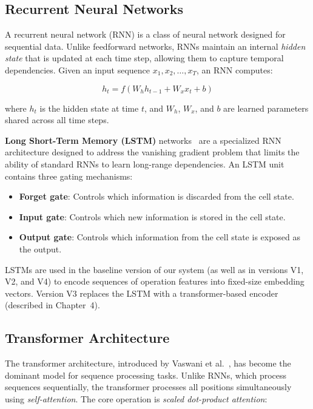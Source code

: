 \subsection{Recurrent Neural Networks}

A recurrent neural network (RNN) is a class of neural network designed for sequential data. Unlike feedforward networks, RNNs maintain an internal \textit{hidden state} that is updated at each time step, allowing them to capture temporal dependencies. Given an input sequence $x_1, x_2, \ldots, x_T$, an RNN computes:

\begin{equation}
    h_t = f(W_h h_{t-1} + W_x x_t + b)
\end{equation}

where $h_t$ is the hidden state at time $t$, and $W_h$, $W_x$, and $b$ are learned parameters shared across all time steps.

\textbf{Long Short-Term Memory (LSTM)} networks~\cite{hochreiter1997lstm} are a specialized RNN architecture designed to address the vanishing gradient problem that limits the ability of standard RNNs to learn long-range dependencies. An LSTM unit contains three gating mechanisms:

\begin{itemize}
    \item \textbf{Forget gate}: Controls which information is discarded from the cell state.
    \item \textbf{Input gate}: Controls which new information is stored in the cell state.
    \item \textbf{Output gate}: Controls which information from the cell state is exposed as the output.
\end{itemize}

LSTMs are used in the baseline version of our system (as well as in versions V1, V2, and V4) to encode sequences of operation features into fixed-size embedding vectors. Version V3 replaces the LSTM with a transformer-based encoder (described in Chapter~4).

\subsection{Transformer Architecture}

The transformer architecture, introduced by Vaswani et al.~\cite{vaswani2017attention}, has become the dominant model for sequence processing tasks. Unlike RNNs, which process sequences sequentially, the transformer processes all positions simultaneously using \textit{self-attention}. The core operation is \textit{scaled dot-product attention}:

